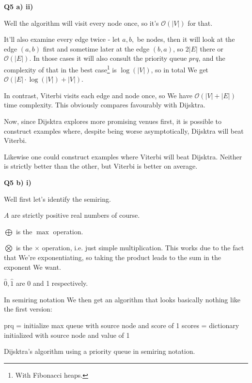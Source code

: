 \documentclass{article}
\begin{document}
\textbf{Q5 a) ii)}

	Well the algorithm will visit every node once, so it's $\mathcal{O}(|V|)$ for that. 
	
	It'll also examine every edge twice - let $a, b,$ be nodes, then it will look at the edge $(a, b)$ first and sometime later at the edge $(b, a)$, so $2|E|$ there or $\mathcal{O}(|E|)$. In those cases it will also consult the priority queue $prq$, and the complexity of that in the best case\footnote{With Fibonacci heaps.}  is $\log(|V|)$, so in total We get $\mathcal{O}(|E|\cdot\log(|V|) + |V|)$.
	
	In contrast, Viterbi visits each edge and node once, so We have $\mathcal{O}(|V| + |E|)$ time complexity. This obviously compares favourably with Dijsktra.
	
	Now, since Dijsktra explores more promising venues first, it is possible to construct examples where, despite being worse asymptotically, Dijsktra will beat Viterbi. 
	
	Likewise one could construct examples where Viterbi will beat Dijsktra. Neither is strictly better than the other, but Viterbi is better on average.
	
\textbf{Q5 b) i)}

	Well first let's identify the semiring.
	
	$A$ are strictly positive real numbers of course.
	
	$\bigoplus$ is the $\max$ operation. 
	
	$\bigotimes$ is the $\times$ operation, i.e. just simple multiplication. This works due to the fact that We're exponentiating, so taking the product leads to the sum in the exponent We want.
	
	$\hat{0}, \hat{1}$ are 0 and 1 respectively.
	
	In semiring notation We then get an algorithm that looks basically nothing like the first version:
	
	\begin{algorithm}[H]
		prq = initialize max queue with source node and score of 1\;
		scores = dictionary initialized with source node and value of 1\;
		 \caption{Dijsktra's algorithm using a priority queue in semiring notation.}
	\end{algorithm}
	
\end{document}
